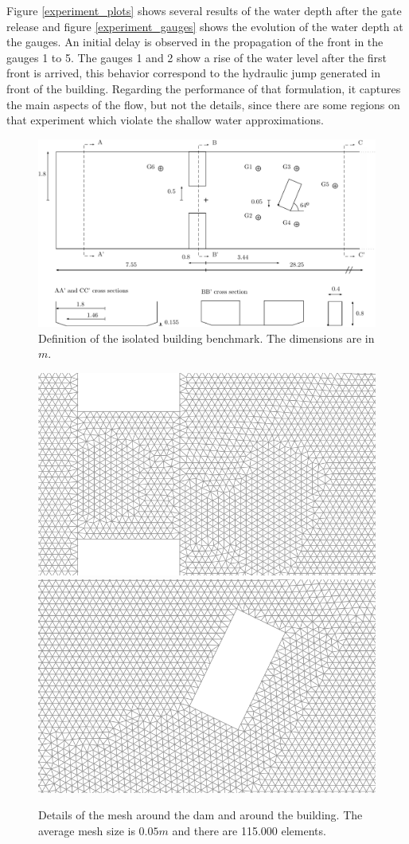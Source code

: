 \documentclass[a4paper,12pt]{article}
\begin{document}
Figure \ref{experiment_plots} shows several results of the water depth after the gate release and figure \ref{experiment_gauges} shows the evolution of the water depth at the gauges. An initial delay is observed in the propagation of the front in the gauges 1 to 5. The gauges 1 and 2 show a rise of the water level after the first front is arrived, this behavior correspond to the hydraulic jump generated in front of the building.
Regarding the performance of that formulation, it captures the main aspects of the flow, but not the details, since there are some regions on that experiment which violate the shallow water approximations.

\begin{figure}[H]
\centering
\includegraphics[width=\textwidth]{img/exp/sketch.pdf}
\caption{Definition of the isolated building benchmark. The dimensions are in $m$.}
\label{experiment_sketch}
\end{figure}


\begin{figure}[H]
\centering
\includegraphics[width=.49\textwidth]{img/exp/mesh_dam.png}
\hfill
\includegraphics[width=.47\textwidth]{img/exp/mesh_building.png}
\caption{Details of the mesh around the dam and around the building. The average mesh size is $0.05m$ and there are 115.000 elements.}
\label{experiment_mesh}
\end{figure}
\end{document}
